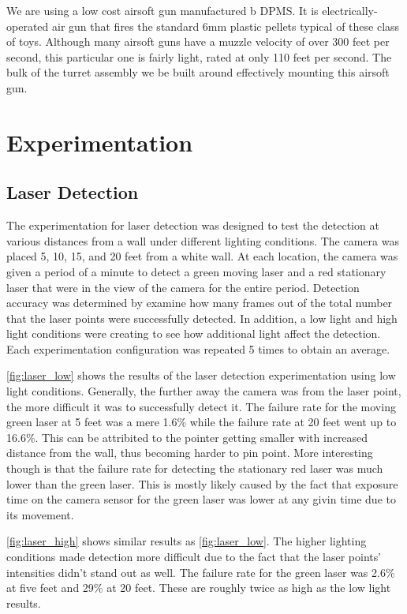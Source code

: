 \documentclass[10pt,twocolumn,letterpaper]{article}
\begin{document}
We are using a low cost airsoft gun manufactured b DPMS. It is electrically-operated air gun that fires the standard 6mm plastic pellets typical of these class of toys. Although many airsoft guns have a muzzle velocity of over 300 feet per second, this particular one is fairly light, rated at only 110 feet per second. The bulk of the turret assembly we be built around effectively mounting this airsoft gun.


\section{Experimentation}

\subsection{Laser Detection}

The experimentation for laser detection was designed to test the detection at various distances from a wall under different lighting conditions. The camera was placed 5, 10, 15, and 20 feet from a white wall. At each location, the camera was given a period of a minute to detect a green moving laser and a red stationary laser that were in the view of the camera for the entire period. Detection accuracy was determined by examine how many frames out of the total number that the laser points were successfully detected. In addition, a low light and high light conditions were creating to see how additional light affect the detection. Each experimentation configuration was repeated 5 times to obtain an average.

\ref{fig:laser_low} shows the results of the laser detection experimentation using low light conditions. Generally, the further away the camera was from the laser point, the more difficult it was to successfully detect it. The failure rate for the moving green laser at 5 feet was a mere 1.6\% while the failure rate at 20 feet went up to 16.6\%. This can be attribited to the pointer getting smaller with increased distance from the wall, thus becoming harder to pin point. More interesting though is that the failure rate for detecting the stationary red laser was much lower than the green laser. This is mostly likely caused by the fact that exposure time on the camera sensor for the green laser was lower at any givin time due to its movement.  

\ref{fig:laser_high} shows similar results as \ref{fig:laser_low}. The higher lighting conditions made detection more difficult due to the fact that the laser points' intensities didn't stand out as well. The failure rate for the green laser was 2.6\% at five feet and 29\% at 20 feet. These are roughly twice as high as the low light results.
\end{document}
